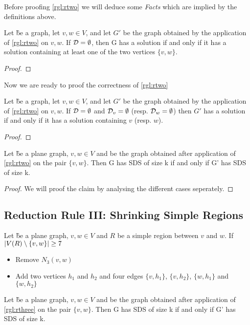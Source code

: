 Before proofing \cref{rgl:rtwo} we will deduce some \textit{Facts} which are implied by the definitions above.

\begin{fact}
    Let \G be a graph, let $v,w \in V$, and let $G'$ be the graph obtained by the application of \cref{rgl:rtwo} on $v,w$. If $\mathcal{D} = \emptyset$, then G has a solution if and only if it has a solution containing at least one of the two vertices $\{v,w \}$.
\end{fact}
\begin{proof}

\end{proof}

Now we are ready to proof the correctness of \cref{rgl:rtwo}

\begin{fact}
    Let \G be a graph, let $v,w \in V$, and let $G'$ be the graph obtained by the application of \cref{rgl:rtwo} on $v, w$. If $\mathcal{D} = \emptyset$ and $\mathcal{D}_{v} = \emptyset$ (resp. $\mathcal{D}_{w} = \emptyset$) then $G'$ has a solution if and only if it has a solution containing $v$ (resp. $w$).
\end{fact}
\begin{proof}

\end{proof}

\begin{lemma}\label{lemma:correctnesstwo}
    Let \G be a plane graph, $v, w \in V$ and \GB be the graph obtained after application of \cref{rgl:rtwo} on the pair $\{v, w\}$. Then G has SDS of size k if and only if G' has SDS of size k.
\end{lemma}
\begin{proof}
    We will proof the claim by analysing the different cases seperately.
\end{proof}

\subsection{Reduction Rule III: Shrinking Simple Regions}


\begin{rgl}\label{rgl:rthree}
    Let \G be a plane graph, $v, w \in V$ and $R$ be a simple region between $v$ and $w$. If $\abs{V(R) \setminus \{v, w\}} \geq 7$
    \begin{itemize}
        \item Remove $N_3(v,w)$
        \item Add two vertices $h_1$ and $h_2$ and four edges $\{v, h_1\}$, $\{v, h_2\}$, $\{w, h_1\}$ and $\{w, h_2\}$
    \end{itemize}
\end{rgl}
\begin{lemma}\label{lemma:correctnessthree}
    Let \G be a plane graph, $v, w \in V$ and \GB be the graph obtained after application of \cref{rgl:rthree} on the pair $\{v, w\}$. Then G has SDS of size k if and only if G' has SDS of size k.
\end{lemma}

